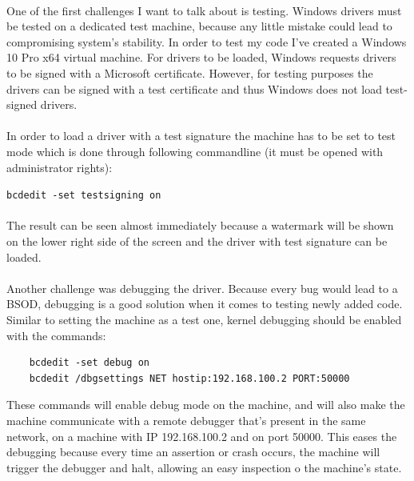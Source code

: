 		\paragraph{}
		One of the first challenges I want to talk about is testing. Windows drivers must be tested on a dedicated test machine, because any little mistake could lead to compromising system's stability. In order to test my code I've created a Windows 10 Pro x64 virtual machine. For drivers to be loaded, Windows requests drivers to be signed with a Microsoft certificate. However, for testing purposes the drivers can be signed with a test certificate and thus Windows does not load test-signed drivers. 
		
		\paragraph{}
		In order to load a driver with a test signature the machine has to be set to test mode which is done through following commandline (it must be opened with administrator rights):
		
		\bigskip
		\centerline {\texttt{bcdedit -set testsigning on}}
		\bigskip
		
		\paragraph{}
		The result can be seen almost immediately because a watermark will be shown on the lower right side of the screen and the driver with test signature can be loaded.
		
		\paragraph{}
		Another challenge was debugging the driver. Because every bug would lead to a BSOD, debugging is a good solution when it comes to testing newly added code. Similar to setting the machine as a test one, kernel debugging should be enabled with the commands:
		
		\bigskip
		\begin{Verbatim}
	bcdedit -set debug on
	bcdedit /dbgsettings NET hostip:192.168.100.2 PORT:50000
		\end{Verbatim}
		\bigskip
		
		These commands will enable debug mode on the machine, and will also make the machine communicate with a remote debugger that's present in the same network, on a machine with IP 192.168.100.2 and on port 50000. This eases the debugging because every time an assertion or crash occurs, the machine will trigger the debugger and halt, allowing an easy inspection o the machine's state.
		
